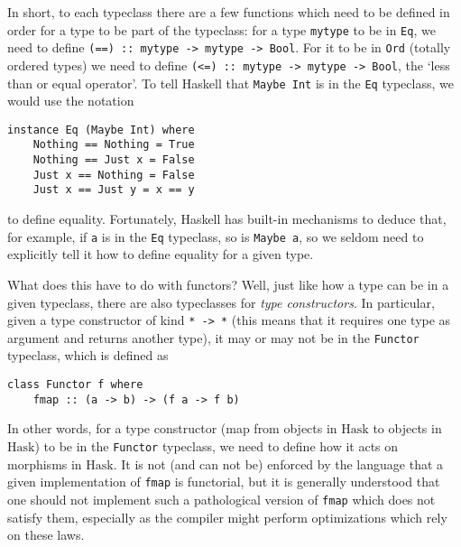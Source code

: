 \documentclass[11pt]{article}
\theoremstyle{nonumberplain}
\newcommand{\Hask}{\mathrm{Hask}}
\newcommand*\lsin{\lstinline}
\begin{document}
In short, to each typeclass there are a few functions which need to be defined in order for a type to be part of the typeclass: for a type \lsin|mytype| to be in \lsin|Eq|, we need to define \lsin|(==) :: mytype -> mytype -> Bool|. For it to be in \lsin|Ord| (totally ordered types) we need to define \lsin|(<=) :: mytype -> mytype -> Bool|, the `less than or equal operator'. To tell Haskell that \lsin|Maybe Int| is in the \lsin|Eq| typeclass, we would use the notation
\begin{lstlisting}
instance Eq (Maybe Int) where
    Nothing == Nothing = True
    Nothing == Just x = False
    Just x == Nothing = False
    Just x == Just y = x == y
\end{lstlisting}
to define equality. Fortunately, Haskell has built-in mechanisms to deduce that, for example, if \lsin|a| is in the \lsin|Eq| typeclass, so is \lsin|Maybe a|, so we seldom need to explicitly tell it how to define equality for a given type.

What does this have to do with functors? Well, just like how a type can be in a given typeclass, there are also typeclasses for \emph{type constructors}. In particular, given a type constructor of kind \lsin|* -> *| (this means that it requires one type as argument and returns another type), it may or may not be in the \lsin|Functor| typeclass, which is defined as
\begin{lstlisting}
class Functor f where
	fmap :: (a -> b) -> (f a -> f b)
\end{lstlisting}

In other words, for a type constructor (map from objects in $\Hask$ to objects in $\Hask$) to be in the \lsin|Functor| typeclass, we need to define how it acts on morphisms in $\Hask$. It is not (and can not be) enforced by the language that a given implementation of \lsin|fmap| is functorial, but it is generally understood that one should not implement such a pathological version of \lsin|fmap| which does not satisfy them, especially as the compiler might perform optimizations which rely on these laws.
\end{document}
